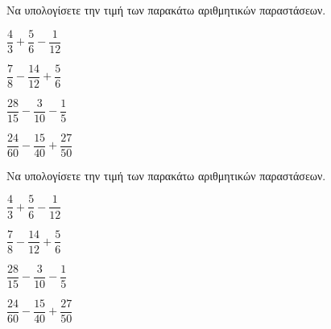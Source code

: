 Να υπολογίσετε την τιμή των παρακάτω αριθμητικών παραστάσεων.
\begin{multicols}{2}
\begin{rlist}
\item $ \dfrac{4}{3}+\dfrac{5}{6}-\dfrac{1}{12} $
\item $ \dfrac{7}{8}-\dfrac{14}{12}+\dfrac{5}{6} $
\item $ \dfrac{28}{15}-\dfrac{3}{10}-\dfrac{1}{5} $
\item $ \dfrac{24}{60}-\dfrac{15}{40}+\dfrac{27}{50} $
\end{rlist}
\end{multicols}
Να υπολογίσετε την τιμή των παρακάτω αριθμητικών παραστάσεων.
\begin{multicols}{2}
\begin{rlist}
\item $ \dfrac{4}{3}+\dfrac{5}{6}-\dfrac{1}{12} $
\item $ \dfrac{7}{8}-\dfrac{14}{12}+\dfrac{5}{6} $
\item $ \dfrac{28}{15}-\dfrac{3}{10}-\dfrac{1}{5} $
\item $ \dfrac{24}{60}-\dfrac{15}{40}+\dfrac{27}{50} $
\end{rlist}
\end{multicols}
